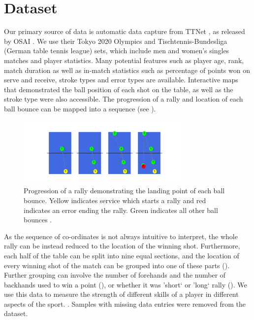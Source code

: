 \section{Dataset} \label{sec:dataset}
Our primary source of data is automatic data capture from TTNet \cite{voeikov2020ttnet}, as released by OSAI \cite{OSAI}. We use their Tokyo 2020 Olympics and Tischtennis-Bundesliga (German table tennis league) sets, which include men and women's singles matches and player statistics. Many potential features such as player age, rank, match duration as well as in-match statistics such as percentage of points won on serve and receive, stroke types and error types are available. Interactive maps that demonstrated the ball position of each shot on the table, as well as the stroke type were also accessible. The progression of a rally and location of each ball bounce can be mapped into a sequence (see ).


\begin{figure}[t]
\centering

\includegraphics[width=8.5cm]{plots/tablesequence.pdf}
\caption{Progression of a rally demonstrating the landing point of each ball bounce. Yellow indicates service which starts a rally and red indicates an error ending the rally. Green indicates all other ball bounces \cite{OSAI}. }

\label{fig:sequence}
\end{figure}

As the sequence of co-ordinates is not always intuitive to interpret, the whole rally can be instead reduced to the location of the winning shot. Furthermore, each half of the table can be split into nine equal sections, and the location of every winning shot of the match can be grouped into one of these parts (). Further grouping can involve the number of forehands and the number of backhands used to win a point (), or whether it was 'short` or 'long` rally (). We use this data to measure the strength of different skills of a player in different aspects of the sport. . Samples with missing data entries were removed from the dataset.

